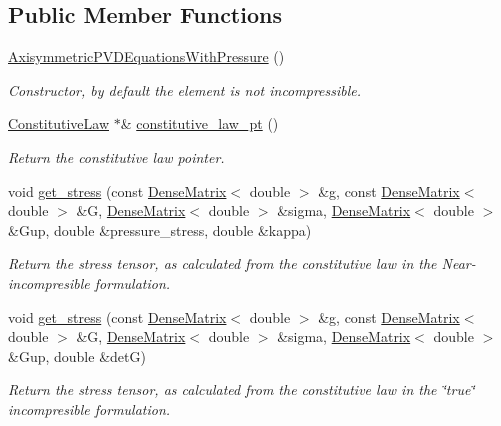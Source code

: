 \subsection*{Public Member Functions}
\begin{DoxyCompactItemize}
\item 
\hyperlink{classoomph_1_1AxisymmetricPVDEquationsWithPressure_a70d70c4f5629ef9479c4530d10828891}{Axisymmetric\+P\+V\+D\+Equations\+With\+Pressure} ()
\begin{DoxyCompactList}\small\item\em Constructor, by default the element is not incompressible. \end{DoxyCompactList}\item 
\hyperlink{classoomph_1_1ConstitutiveLaw}{Constitutive\+Law} $\ast$\& \hyperlink{classoomph_1_1AxisymmetricPVDEquationsWithPressure_aa16430aa0a4158f8834a0c23fcf98cc4}{constitutive\+\_\+law\+\_\+pt} ()
\begin{DoxyCompactList}\small\item\em Return the constitutive law pointer. \end{DoxyCompactList}\item 
void \hyperlink{classoomph_1_1AxisymmetricPVDEquationsWithPressure_af74b386309449d7022b9599674d58088}{get\+\_\+stress} (const \hyperlink{classoomph_1_1DenseMatrix}{Dense\+Matrix}$<$ double $>$ \&g, const \hyperlink{classoomph_1_1DenseMatrix}{Dense\+Matrix}$<$ double $>$ \&G, \hyperlink{classoomph_1_1DenseMatrix}{Dense\+Matrix}$<$ double $>$ \&sigma, \hyperlink{classoomph_1_1DenseMatrix}{Dense\+Matrix}$<$ double $>$ \&Gup, double \&pressure\+\_\+stress, double \&kappa)
\begin{DoxyCompactList}\small\item\em Return the stress tensor, as calculated from the constitutive law in the Near-\/incompresible formulation. \end{DoxyCompactList}\item 
void \hyperlink{classoomph_1_1AxisymmetricPVDEquationsWithPressure_af9614022b7f3e3fe4ffa9d1de15bfda7}{get\+\_\+stress} (const \hyperlink{classoomph_1_1DenseMatrix}{Dense\+Matrix}$<$ double $>$ \&g, const \hyperlink{classoomph_1_1DenseMatrix}{Dense\+Matrix}$<$ double $>$ \&G, \hyperlink{classoomph_1_1DenseMatrix}{Dense\+Matrix}$<$ double $>$ \&sigma, \hyperlink{classoomph_1_1DenseMatrix}{Dense\+Matrix}$<$ double $>$ \&Gup, double \&detG)
\begin{DoxyCompactList}\small\item\em Return the stress tensor, as calculated from the constitutive law in the \char`\"{}true\char`\"{} incompresible formulation. \end{DoxyCompactList}\item 

\end{DoxyCompactItemize}
